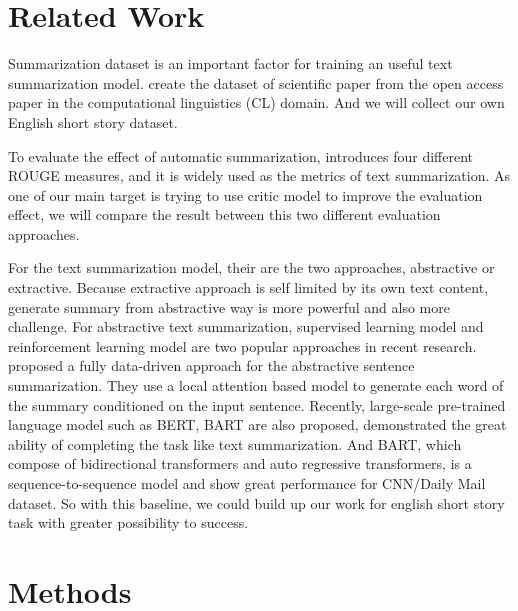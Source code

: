 \documentclass[11pt,a4paper]{article}
\begin{document}
\section{Related Work}
\label{Related Work}
Summarization dataset is an important factor for training an useful text summarization model. \cite{scisumm} create the dataset of scientific paper from the open access paper in the computational linguistics (CL) domain. And we will collect our own English short story dataset.

To evaluate the effect of automatic summarization, \cite{lin-2004-rouge} introduces four different ROUGE measures, and it is widely used as the metrics of text summarization. As one of our main target is trying to use critic model to improve the evaluation effect, we will compare the result between this two different evaluation approaches. 

For the text summarization model, their are the two approaches, abstractive or extractive. Because extractive approach is self limited by its own text content, generate summary from abstractive way is more powerful and also more challenge. For abstractive text summarization, supervised learning model and reinforcement learning model are two popular approaches in recent research. \cite{Rush_2015} proposed a fully data-driven approach for the abstractive sentence summarization. They use a local attention based model to generate each word of the summary conditioned on the input sentence. Recently, large-scale pre-trained language model such as BERT\cite{devlin2018bert}, BART\cite{lewis2019bart} are also proposed, demonstrated the great ability of completing the task like text summarization. And BART, which compose of bidirectional transformers and auto regressive transformers, is a sequence-to-sequence model and show great performance for CNN/Daily Mail dataset. So with this baseline, we could build up our work for english short story task with greater possibility to success.

\section{Methods}
\label{methods}
\end{document}
